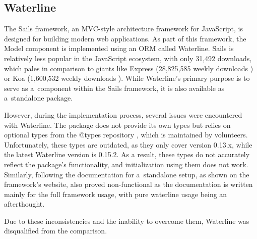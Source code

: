 \subsection{Waterline}

The Sails framework, an MVC-style architecture framework for JavaScript, is
designed for building modern web applications. As part of this framework, the
Model component is implemented using an ORM called Waterline. Sails is
relatively less popular in the JavaScript ecosystem, with only 31,492 downloads,
which pales in comparison to giants like Express (28,825,585 weekly downloads
\cite{express_2022}) or Koa (1,600,532 weekly downloads \cite{koa_2023}). While Waterline's
primary purpose is to serve as a~component within the Sails framework, it is
also available as a~standalone package.

However, during the implementation process, several issues were encountered with
Waterline. The package does not provide its own types but relies on optional
types from the @types repository \cite{definitelytyped/types/waterline}, which
is maintained by volunteers. Unfortunately, these types are outdated, as they
only cover version 0.13.x, while the latest Waterline version is 0.15.2. As a
result, these types do not accurately reflect the package's functionality, and
initialization using them does not work. Similarly, following the documentation
for a~standalone setup, as shown on the framework's website, also proved
non-functional as the documentation \cite{waterline-docs} is written mainly for
the full framework usage, with pure waterline usage being an afterthought.

Due to these inconsistencies and the inability to overcome them, Waterline was
disqualified from the comparison.